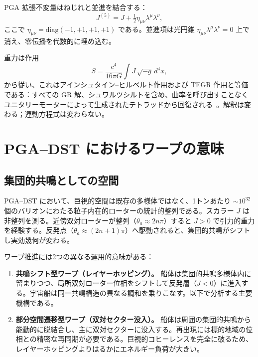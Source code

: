 \documentclass[dvipdfmx,a4paper]{article}
\theoremstyle{definition}
\begin{document}
PGA 拡張不変量はねじれと並進を結合する：
\begin{equation}
J^{(5)} = J + \tfrac{1}{2}\eta_{\mu\nu}\lambda^\mu\lambda^\nu,
\label{eq:J5}
\end{equation}
ここで $\eta_{\mu\nu}=\mathrm{diag}(-1,+1,+1,+1)$ である。並進項は光円錐 $\eta_{\mu\nu}\lambda^\mu\lambda^\nu=0$ 上で消え、零伝播を代数的に埋め込む。

重力は作用
\begin{equation}
S = \frac{c^4}{16\pi G}\int J\,\sqrt{-g}\,d^4x,
\label{eq:action}
\end{equation}
から従い、これはアインシュタイン--ヒルベルト作用および TEGR 作用と等価である：すべての GR 解、シュワルツシルトを含め、曲率を呼び出すことなくユニタリーモーターによって生成されたテトラッドから回復される~\cite{pga2025,tegr}。解釈は変わる；運動方程式は変わらない。

\section{PGA--DST におけるワープの意味}
\label{sec:warp-ontology}

\subsection{集団的共鳴としての空間}

PGA--DST において、巨視的空間は既存の多様体ではなく、1トンあたり $\sim 10^{32}$ 個のバリオンにわたる粒子内在的ローターの統計的整列である。スカラー $J$ は非整列を測る。近傍双対ローターが整列（$\theta_a\approx 2n\pi$）すると $J>0$ で引力的重力を経験する。反発点（$\theta_a\approx(2n+1)\pi$）へ駆動されると、集団的共鳴がシフトし実効幾何が変わる。

ワープ推進には2つの異なる運用的意味がある：

\begin{enumerate}[leftmargin=2em]
  \item \textbf{共鳴シフト型ワープ（レイヤーホッピング）。}
  船体は集団的共鳴多様体内に留まりつつ、局所双対ローター位相をシフトして反発層（$J<0$）に進入する。宇宙船は同一共鳴構造の異なる調和を乗りこなす。以下で分析する主要機構である。

  \item \textbf{部分空間遷移型ワープ（双対セクター没入）。}
  船体は周囲の集団的共鳴から能動的に脱結合し、主に双対セクターに没入する。再出現には標的地域の位相との精密な再同期が必要である。巨視的コヒーレンスを完全に破るため、レイヤーホッピングよりはるかにエネルギー負荷が大きい。
\end{enumerate}
\end{document}
